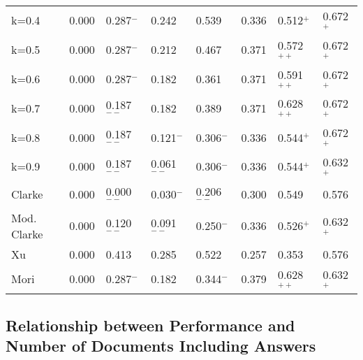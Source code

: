 \begin{table}[t]
\begin{center}
\begin{tabular}{|l@{ }|l@{ }|l@{ }|l@{ }|l@{ }|l@{ }|l@{ }|l@{ }|}
k=0.4             & 0.000        & 0.287$^{-}$  & 0.242        & 0.539        & 0.336        & 0.512$^{+}$  & 0.672$^{+}$\\
k=0.5             & 0.000        & 0.287$^{-}$  & 0.212        & 0.467        & 0.371        & 0.572$^{++}$ & 0.672$^{+}$\\
k=0.6             & 0.000        & 0.287$^{-}$  & 0.182        & 0.361        & 0.371        & 0.591$^{++}$ & 0.672$^{+}$\\
k=0.7             & 0.000        & 0.187$^{--}$ & 0.182        & 0.389        & 0.371        & 0.628$^{++}$ & 0.672$^{+}$\\
k=0.8             & 0.000        & 0.187$^{--}$ & 0.121$^{-}$  & 0.306$^{-}$  & 0.336        & 0.544$^{+}$  & 0.672$^{+}$\\
k=0.9             & 0.000        & 0.187$^{--}$ & 0.061$^{--}$ & 0.306$^{-}$  & 0.336        & 0.544$^{+}$  & 0.632$^{+}$\\\hline
Clarke            & 0.000        & 0.000$^{--}$ & 0.030$^{-}$  & 0.206$^{--}$ & 0.300        & 0.549        & 0.576\\\hline
Mod. Clarke       & 0.000        & 0.120$^{--}$ & 0.091$^{--}$ & 0.250$^{-}$  & 0.336        & 0.526$^{+}$  & 0.632$^{+}$\\\hline
Xu                & 0.000        & 0.413        & 0.285        & 0.522        & 0.257        & 0.353        & 0.576\\\hline
Mori              & 0.000        & 0.287$^{-}$  & 0.182        & 0.344$^{-}$  & 0.379        & 0.628$^{++}$ & 0.632$^{+}$\\\hline
\end{tabular}
\label{tab:task-2-docnum}
\end{center}
\end{table}

\subsection{Relationship between Performance and Number of Documents Including Answers}

